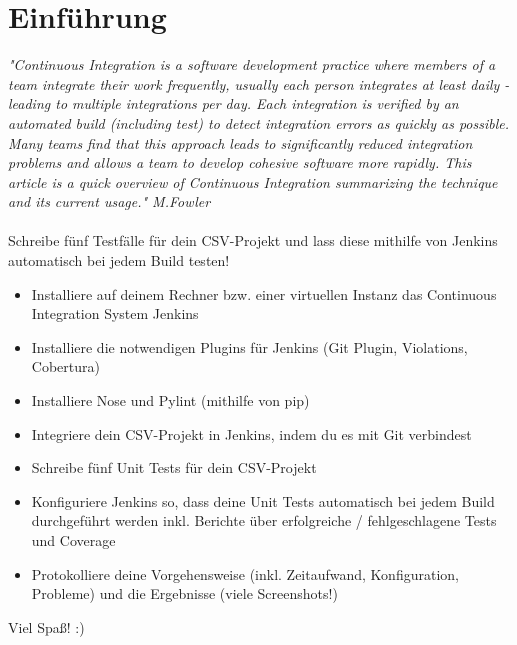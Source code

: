 \documentclass[letterpaper, 12pt]{article}
\let\tempsection\section
\renewcommand\section[1]{\vspace{-0.3cm}\tempsection{#1}\vspace{-0.3cm}}
\begin{document}
\parindent 0pt
\parskip 6pt



\clearpage
\thispagestyle{empty}
\tableofcontents

\newpage
{}
\pagestyle{fancy}

\section{Einführung}
\textit{"Continuous Integration is a software development practice where members of a team integrate their work frequently, usually each person integrates at least daily - leading to multiple integrations per day. Each integration is verified by an automated build (including test) to detect integration errors as quickly as possible. Many teams find that this approach leads to significantly reduced integration problems and allows a team to develop cohesive software more rapidly. This article is a quick overview of Continuous Integration summarizing the technique and its current usage." M.Fowler} \\ \\

Schreibe fünf Testfälle für dein CSV-Projekt und lass diese mithilfe von Jenkins automatisch bei jedem Build testen!

\begin{itemize}
	\item Installiere auf deinem Rechner bzw. einer virtuellen Instanz das Continuous Integration System Jenkins
	\item Installiere die notwendigen Plugins für Jenkins (Git Plugin, Violations, Cobertura)
	\item Installiere Nose und Pylint (mithilfe von pip)
	\item Integriere dein CSV-Projekt in Jenkins, indem du es mit Git verbindest
	\item Schreibe fünf Unit Tests für dein CSV-Projekt
	\item Konfiguriere Jenkins so, dass deine Unit Tests automatisch bei jedem Build durchgeführt werden inkl. Berichte über erfolgreiche / fehlgeschlagene Tests und Coverage
	\item Protokolliere deine Vorgehensweise (inkl. Zeitaufwand, Konfiguration, Probleme) und die Ergebnisse (viele Screenshots!)
\end{itemize}

Viel Spaß! :)
\newpage
\end{document}
